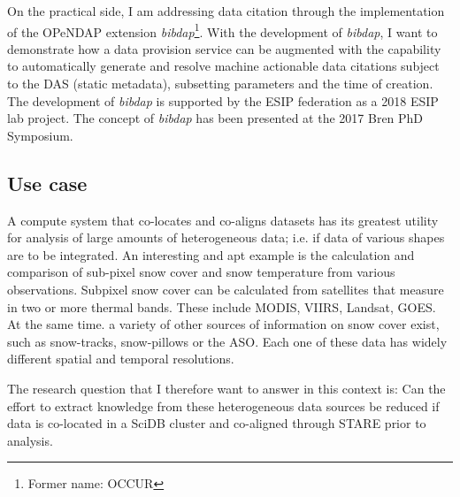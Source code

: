 \documentclass[a4paper,10pt]{article}
\begin{document}
On the practical side, I am addressing data citation through
the implementation of the OPeNDAP extension \textit{bibdap}\footnote{Former name: OCCUR}.
With the development of \textit{bibdap}, I want to demonstrate how a data provision service can be augmented with the capability to automatically generate and resolve machine actionable data citations subject to the \gls{DAS} (static metadata), subsetting parameters and the time of creation. The development of \textit{bibdap} is supported by the ESIP federation as a 2018 \gls{ESIP} lab project. The concept of \textit{bibdap} has been presented at the 2017 Bren PhD Symposium.
  
\newpage


\subsection{Use case}
A compute system that co-locates and co-aligns datasets has its greatest utility for
analysis of large amounts of heterogeneous data; i.e. if data of various shapes are to be integrated. An interesting and apt example is the calculation and comparison of sub-pixel snow cover and snow temperature from various observations.
Subpixel snow cover can be calculated from satellites that measure in two or more thermal bands. These include MODIS, VIIRS, Landsat, GOES.
At the same time. a variety of other sources of information on snow cover exist, such as snow-tracks, snow-pillows or the \gls{ASO}.
Each one of these data has widely different spatial and temporal resolutions.

The research question that I therefore want to answer in this context is:
Can the effort to extract knowledge from these heterogeneous data sources be reduced
if data is co-located in a SciDB cluster and co-aligned through STARE prior to analysis.
\end{document}
